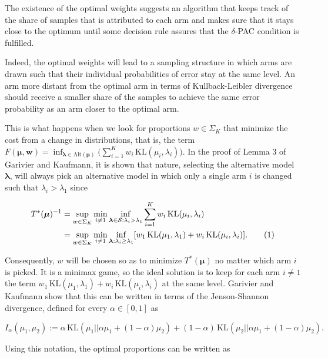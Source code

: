 \documentclass[11pt,]{article}
\newcommand{\KL}{\,\text{KL}}
\newcommand*{\Alignyesnumber}{\refstepcounter{equation}\tag{\theequation}}%
\begin{document}
The existence of the optimal weights suggests an algorithm that keeps
track of the share of samples that is attributed to each arm and makes
sure that it stays close to the optimum until some decision rule assures
that the \(\delta\)-PAC condition is fulfilled.

Indeed, the optimal weights will lead to a sampling structure in which
arms are drawn such that their individual probabilities of error stay at
the same level. An arm more distant from the optimal arm in terms of
Kullback-Leibler divergence should receive a smaller share of the
samples to achieve the same error probability as an arm closer to the
optimal arm.

This is what happens when we look for proportions \(w \in \Sigma_K\)
that minimize the cost from a change in distributions, that is, the term
\(F(\bm{\mu}, \bm{w}) = \inf_{\bm{\lambda} \in \text{Alt}(\bm{\mu})} \Big(\sum_{i= 1}^K w_i \KL(\mu_i, \lambda_i)\Big)\).
In the proof of Lemma 3 of Garivier and Kaufmann, it is shown that
nature, selecting the alternative model \(\bm{\lambda}\), will always
pick an alternative model in which only a single arm \(i\) is changed
such that \(\lambda_i > \lambda_1\) since

\begin{align*}
T^*(\bm{\mu})^{-1} & = \sup_{w \in \Sigma_K} \min_{i \neq 1} \inf_{\bm{\lambda} \in \mathcal{S}: \lambda_i > \lambda_1} \sum_{i=1}^K w_i \KL(\mu_i, \lambda_i)  \\
& = \sup_{w \in \Sigma_K} \min_{i \neq 1} \inf_{\bm{\lambda}: \lambda_i \geq \lambda_1} [w_1 \KL(\mu_1, \lambda_1)+w_i \KL(\mu_i, \lambda_i)]. \Alignyesnumber\label{eqn:ComplexityTrackStopStrategy}
\end{align*}

Consequently, \(w\) will be chosen so as to minimize \(T^*(\bm{\mu})\)
no matter which arm \(i\) is picked. It is a minimax game, so the ideal
solution is to keep for each arm \(i \neq 1\) the term
\(w_1 \KL(\mu_1, \lambda_1) + w_i \KL(\mu_i, \lambda_i)\) at the same
level. Garivier and Kaufmann show that this can be written in terms of
the Jenson-Shannon divergence, defined for every \(\alpha \in [0,1]\) as

\begin{equation*}
I_{\alpha}(\mu_1, \mu_2) := \alpha \KL(\mu_1 || \alpha \mu_1 + (1-\alpha) \mu_2) + (1-\alpha) \KL(\mu_2 || \alpha \mu_1 + (1-\alpha) \mu_2).
\end{equation*}

Using this notation, the optimal proportions can be written as
\end{document}

